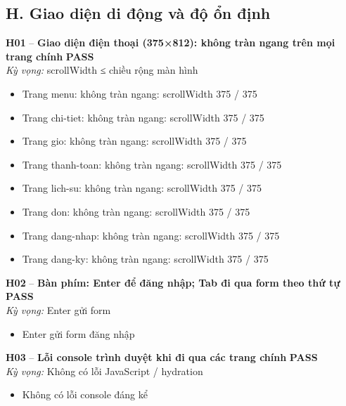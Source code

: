 \documentclass[a4paper,11pt]{article}
\newcommand{\ok}{\textcolor{okgreen}{\textbf{PASS}}}
\begin{document}
\subsection{H. Giao diện di động và độ ổn định}
\begin{minipage}{\textwidth}\vspace{4pt}\textbf{\textcolor{brew}{H01}} -- \textbf{Giao diện điện thoại (375×812): không tràn ngang trên mọi trang chính} \hfill \ok\\
{\small\emph{Kỳ vọng:} scrollWidth ≤ chiều rộng màn hình}
\end{minipage}
\begin{itemize}\footnotesize
\item \tick Trang menu: không tràn ngang: scrollWidth 375 / 375
\item \tick Trang chi-tiet: không tràn ngang: scrollWidth 375 / 375
\item \tick Trang gio: không tràn ngang: scrollWidth 375 / 375
\item \tick Trang thanh-toan: không tràn ngang: scrollWidth 375 / 375
\item \tick Trang lich-su: không tràn ngang: scrollWidth 375 / 375
\item \tick Trang don: không tràn ngang: scrollWidth 375 / 375
\item \tick Trang dang-nhap: không tràn ngang: scrollWidth 375 / 375
\item \tick Trang dang-ky: không tràn ngang: scrollWidth 375 / 375
\end{itemize}
\begin{minipage}{\textwidth}\vspace{4pt}\textbf{\textcolor{brew}{H02}} -- \textbf{Bàn phím: Enter để đăng nhập; Tab đi qua form theo thứ tự} \hfill \ok\\
{\small\emph{Kỳ vọng:} Enter gửi form}
\end{minipage}
\begin{itemize}\footnotesize
\item \tick Enter gửi form đăng nhập
\end{itemize}
\begin{minipage}{\textwidth}\vspace{4pt}\textbf{\textcolor{brew}{H03}} -- \textbf{Lỗi console trình duyệt khi đi qua các trang chính} \hfill \ok\\
{\small\emph{Kỳ vọng:} Không có lỗi JavaScript / hydration}
\end{minipage}
\begin{itemize}\footnotesize
\item \tick Không có lỗi console đáng kể
\end{itemize}
\end{document}
